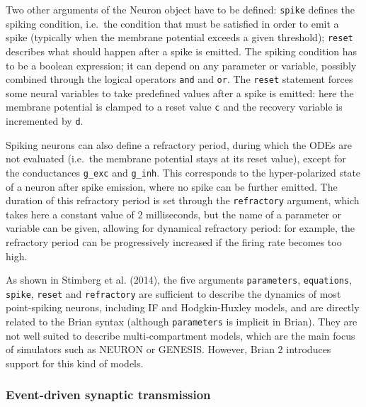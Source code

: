 \documentclass[
  11pt,
  a4paper,
]{scrbook}
\begin{document}
Two other arguments of the Neuron object have to be defined:
\texttt{spike} defines the spiking condition, i.e.~the condition that
must be satisfied in order to emit a spike (typically when the membrane
potential exceeds a given threshold); \texttt{reset} describes what
should happen after a spike is emitted. The spiking condition has to be
a boolean expression; it can depend on any parameter or variable,
possibly combined through the logical operators \texttt{and} and
\texttt{or}. The \texttt{reset} statement forces some neural variables
to take predefined values after a spike is emitted: here the membrane
potential is clamped to a reset value \texttt{c} and the recovery
variable is incremented by \texttt{d}.

Spiking neurons can also define a refractory period, during which the
ODEs are not evaluated (i.e.~the membrane potential stays at its reset
value), except for the conductances \texttt{g\_exc} and \texttt{g\_inh}.
This corresponds to the hyper-polarized state of a neuron after spike
emission, where no spike can be further emitted. The duration of this
refractory period is set through the \texttt{refractory} argument, which
takes here a constant value of 2 milliseconds, but the name of a
parameter or variable can be given, allowing for dynamical refractory
period: for example, the refractory period can be progressively
increased if the firing rate becomes too high.

As shown in Stimberg et al. (2014), the five arguments
\texttt{parameters}, \texttt{equations}, \texttt{spike}, \texttt{reset}
and \texttt{refractory} are sufficient to describe the dynamics of most
point-spiking neurons, including IF and Hodgkin-Huxley models, and are
directly related to the Brian syntax (although \texttt{parameters} is
implicit in Brian). They are not well suited to describe
multi-compartment models, which are the main focus of simulators such as
NEURON or GENESIS. However, Brian 2 introduces support for this kind of
models.

\subsubsection*{Event-driven synaptic
transmission}\label{event-driven-synaptic-transmission}
\end{document}
